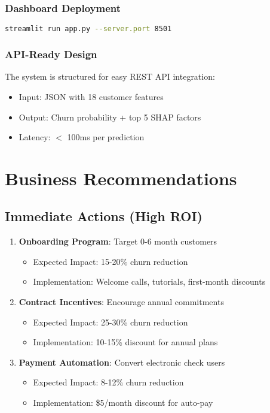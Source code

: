 \documentclass[11pt,a4paper]{article}
\begin{document}
\subsubsection{Dashboard Deployment}
\begin{lstlisting}[language=bash]
streamlit run app.py --server.port 8501
\end{lstlisting}

\subsubsection{API-Ready Design}
The system is structured for easy REST API integration:
\begin{itemize}
    \item Input: JSON with 18 customer features
    \item Output: Churn probability + top 5 SHAP factors
    \item Latency: $<$ 100ms per prediction
\end{itemize}

\section{Business Recommendations}

\subsection{Immediate Actions (High ROI)}

\begin{enumerate}
    \item \textbf{Onboarding Program}: Target 0-6 month customers
    \begin{itemize}
        \item Expected Impact: 15-20\% churn reduction
        \item Implementation: Welcome calls, tutorials, first-month discounts
    \end{itemize}
    
    \item \textbf{Contract Incentives}: Encourage annual commitments
    \begin{itemize}
        \item Expected Impact: 25-30\% churn reduction
        \item Implementation: 10-15\% discount for annual plans
    \end{itemize}
    
    \item \textbf{Payment Automation}: Convert electronic check users
    \begin{itemize}
        \item Expected Impact: 8-12\% churn reduction
        \item Implementation: \$5/month discount for auto-pay
    \end{itemize}
\end{enumerate}
\end{document}
